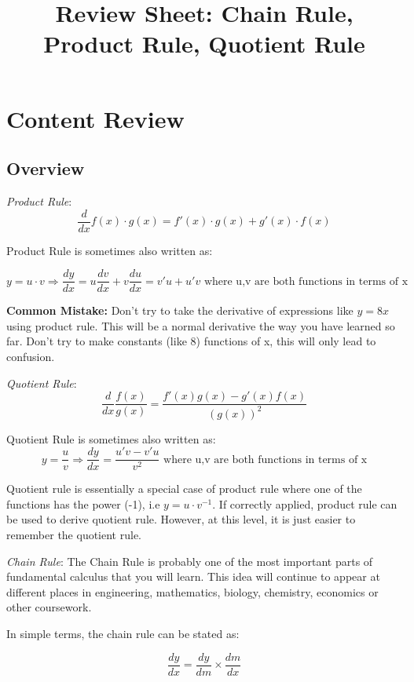 \documentclass{article}
\title{Review Sheet: Chain Rule, Product Rule, Quotient Rule}
\date{}
\author{}
\begin{document}
\maketitle
\vspace{-0.75in}
\section*{Content Review}
\subsection*{Overview}

\textit{Product Rule}: 
$$\frac{d}{dx} f(x) \cdot g(x) = f'(x) \cdot g(x) + g'(x) \cdot f(x)$$

\noindent Product Rule is sometimes also written as:

$$y = u\cdot v \Longrightarrow \frac{dy}{dx} = u \frac{dv}{dx} + v \frac{du}{dx} = v'u + u'v   \text{  where u,v are both functions in terms of x}$$

\noindent \textbf{Common Mistake:} Don't try to take the derivative of expressions like $y = 8x$ using product rule. This will be a normal derivative the way you have learned so far. Don't try to make constants (like 8) functions of x, this will only lead to confusion. 

\noindent \newline \textit{Quotient Rule}:
$$\frac{d}{dx}\frac{f(x)}{g(x)} = \frac{f'(x)g(x) - g'(x)f(x)}{(g(x))^2}$$

\noindent Quotient Rule is sometimes also written as:
$$y = \frac{u}{v} \Longrightarrow \frac{dy}{dx} = \frac{u'v - v'u}{v^2} \text{   where u,v are both functions in terms of x}$$

\noindent Quotient rule is essentially a special case of product rule where one of the functions has the power (-1), i.e $y = u\cdot v^{-1}$. If correctly applied, product rule can be used to derive quotient rule. However, at this level, it is just easier to remember the quotient rule. 

\noindent\newline 
\textit{Chain Rule}: The Chain Rule is probably one of the most important parts of fundamental calculus that you will learn. This idea will continue to appear at different places in engineering, mathematics, biology, chemistry, economics or other coursework. 

\noindent In simple terms, the chain rule can be stated as:

$$\frac{dy}{dx} = \frac{dy}{dm} \times \frac{dm}{dx}$$
\end{document}
